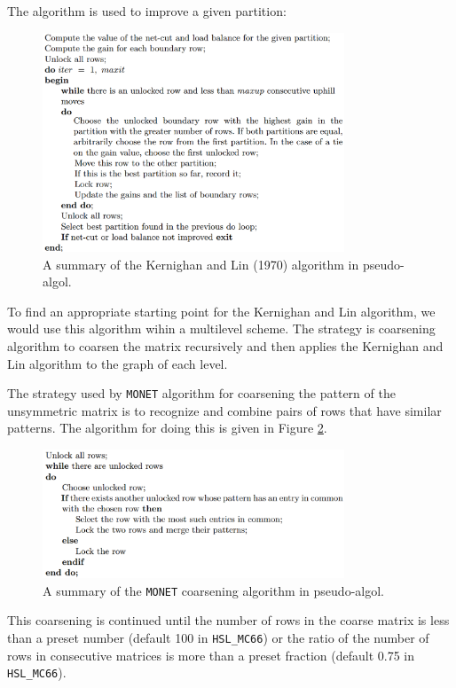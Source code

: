 \begin{alg}
  The algorithm is used to improve a given partition:
\begin{figure}[H]
    \centering
    \includegraphics[width=9cm]{png/LinAlgorithm.png}
    \caption{A summary of the Kernighan and Lin (1970) algorithm in
      pseudo-algol.}
    \label{fig:LinAlgorithm}
  \end{figure}
\end{alg}

\begin{rmk}
  To find an appropriate starting point for the Kernighan and Lin
  algorithm, we would use this algorithm wihin a multilevel
  scheme. The strategy is coarsening algorithm to coarsen the matrix recursively
  and then applies the Kernighan and Lin algorithm to the graph of
  each level.
\end{rmk}

\begin{alg}
  The strategy used by \texttt{MONET} algorithm for coarsening the pattern of
  the unsymmetric matrix is to recognize and combine pairs of rows
  that have similar patterns. The algorithm for doing this is given in
  Figure \ref{fig:Monet}. 

  \begin{figure}[H]
    \centering
    \includegraphics[width=9cm]{png/MONET.png}
    \caption{A summary of the \texttt{MONET} coarsening algorithm in
      pseudo-algol.}
    \label{fig:Monet}
  \end{figure}

  This coarsening is continued until the number of rows in the coarse matrix is
less than a preset number (default 100 in \texttt{HSL\_MC66}) or the ratio of the number
of rows in consecutive matrices is more than a preset fraction (default 0.75 in
\texttt{HSL\_MC66}).
\end{alg}

